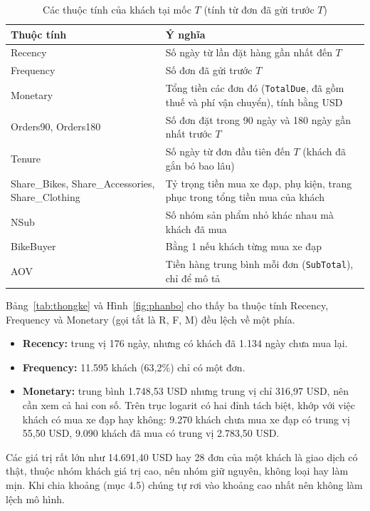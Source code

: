 \begin{table}[H]
\centering
\caption{Các thuộc tính của khách tại mốc $T$ (tính từ đơn đã gửi trước $T$)}
\label{tab:thuoctinh}
\footnotesize
\begin{tabular}{p{4.4cm}p{10cm}}
\toprule
Thuộc tính & Ý nghĩa \\
\midrule
Recency & Số ngày từ lần đặt hàng gần nhất đến $T$ \\
Frequency & Số đơn đã gửi trước $T$ \\
Monetary & Tổng tiền các đơn đó (\texttt{TotalDue}, đã gồm thuế và phí vận chuyển), tính bằng USD \\
Orders90, Orders180 & Số đơn đặt trong 90 ngày và 180 ngày gần nhất trước $T$ \\
Tenure & Số ngày từ đơn đầu tiên đến $T$ (khách đã gắn bó bao lâu) \\
Share\_Bikes, Share\_Accessories, Share\_Clothing & Tỷ trọng tiền mua xe đạp, phụ kiện, trang phục trong tổng tiền mua của khách \\
NSub & Số nhóm sản phẩm nhỏ khác nhau mà khách đã mua \\
BikeBuyer & Bằng 1 nếu khách từng mua xe đạp \\
AOV & Tiền hàng trung bình mỗi đơn (\texttt{SubTotal}), chỉ để mô tả \\
\bottomrule
\end{tabular}
\end{table}

Bảng~\ref{tab:thongke} và Hình~\ref{fig:phanbo} cho thấy ba thuộc tính Recency, Frequency và Monetary (gọi tắt là R, F, M) đều lệch về một phía.
\begin{itemize}
    \item \textbf{Recency:} trung vị 176 ngày, nhưng có khách đã 1.134 ngày chưa mua lại.
    \item \textbf{Frequency:} 11.595 khách (63,2\%) chỉ có một đơn.
    \item \textbf{Monetary:} trung bình 1.748,53 USD nhưng trung vị chỉ 316,97 USD, nên cần xem cả hai con số. Trên trục logarit có hai đỉnh tách biệt, khớp với việc khách có mua xe đạp hay không: 9.270 khách chưa mua xe đạp có trung vị 55,50 USD, 9.090 khách đã mua có trung vị 2.783,50 USD.
\end{itemize}
Các giá trị rất lớn như 14.691,40 USD hay 28 đơn của một khách là giao dịch có thật, thuộc nhóm khách giá trị cao, nên nhóm giữ nguyên, không loại hay làm mịn. Khi chia khoảng (mục 4.5) chúng tự rơi vào khoảng cao nhất nên không làm lệch mô hình.

